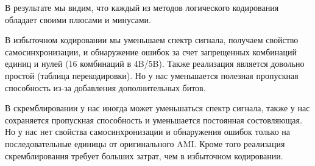 \documentclass[12pt,onecolumn]{article}
\begin{document}
В результате мы видим, что каждый из методов логического кодирования обладает своими плюсами и минусами.

В избыточном кодировании мы уменьшаем спектр сигнала, получаем свойство самосинхронизации, и обнаружение ошибок за счет запрещенных комбинаций единиц и нулей (16 комбинаций в 4B/5B). Также реализация является довольно простой (таблица перекодировки). Но у нас уменьшается полезная пропускная способность из-за добавления дополнительных битов. 

В скремблировании у нас иногда может уменьшаться спектр сигнала, также у нас сохраняется пропускная способность и уменьшается постоянная состовляющая. Но у нас нет свойства самосинхронизации и обнаружения ошибок только на последовательные единицы от оригинального AMI.
Кроме того реализация скремблирования требует больших затрат, чем в избыточном кодировании. 
\end{document}
